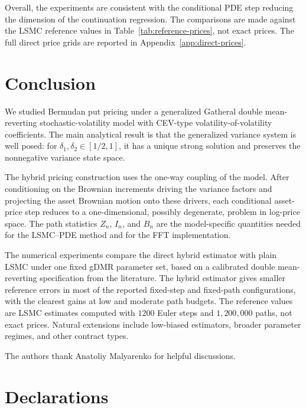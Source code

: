 \documentclass[pdflatex,sn-mathphys-num]{sn-jnl}
\theoremstyle{thmstyleone}%
\theoremstyle{thmstylethree}%
\theoremstyle{thmstyletwo}%
\begin{document}
\FloatBarrier

Overall, the experiments are consistent with the conditional PDE step reducing
the dimension of the continuation regression. The comparisons are
made against the LSMC reference values in Table~\ref{tab:reference-prices}, not exact prices. The full direct
price grids are reported in Appendix~\ref{app:direct-prices}.

\section{Conclusion}\label{sec:conclusion}

We studied Bermudan put pricing under a generalized Gatheral double
mean-reverting stochastic-volatility model with CEV-type
volatility-of-volatility coefficients. The main analytical result is that the
generalized variance system is well posed: for
$\delta_1,\delta_2\in[1/2,1]$, it has a unique strong solution and preserves
the nonnegative variance state space.

The hybrid pricing construction uses the one-way coupling of the model. After
conditioning on the Brownian increments driving the variance factors and
projecting the asset Brownian motion onto these drivers, each conditional
asset-price step reduces to a one-dimensional, possibly degenerate, problem in
log-price space. The path statistics $Z_n$, $I_n$, and $B_n$ are the
model-specific quantities
needed for the LSMC--PDE method and for the FFT implementation.

The numerical experiments compare the direct hybrid estimator with plain LSMC
under one fixed gDMR parameter set, based on a calibrated double mean-reverting
specification from the literature. The hybrid estimator gives smaller reference
errors in most of the reported fixed-step and fixed-path configurations, with
the clearest gains at low and moderate path budgets. The reference values are
LSMC estimates computed with $1200$ Euler steps and $1{,}200{,}000$ paths,
not exact prices. Natural extensions include low-biased estimators, broader
parameter regimes, and other contract types.



\backmatter

The authors thank Anatoliy Malyarenko for helpful discussions.

\section*{Declarations}
\end{document}
